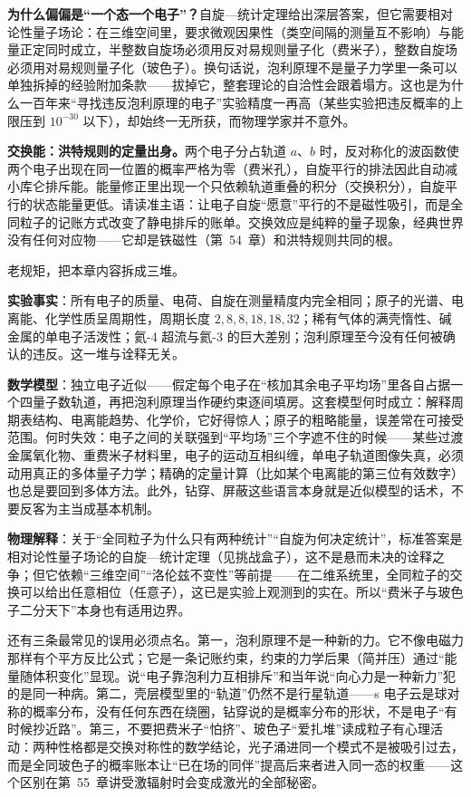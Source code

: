 \begin{challenge}
\textbf{为什么偏偏是“一个态一个电子”？}自旋—统计定理给出深层答案，但它需要相对论性量子场论：在三维空间里，要求微观因果性（类空间隔的测量互不影响）与能量正定同时成立，半整数自旋场必须用反对易规则量子化（费米子），整数自旋场必须用对易规则量子化（玻色子）。换句话说，泡利原理不是量子力学里一条可以单独拆掉的经验附加条款——拔掉它，整套理论的自洽性会跟着塌方。这也是为什么一百年来“寻找违反泡利原理的电子”实验精度一再高（某些实验把违反概率的上限压到 \(10^{-30}\) 以下），却始终一无所获，而物理学家并不意外。

\textbf{交换能：洪特规则的定量出身。}两个电子分占轨道 \(a\)、\(b\) 时，反对称化的波函数使两个电子出现在同一位置的概率严格为零（费米孔），自旋平行的排法因此自动减小库仑排斥能。能量修正里出现一个只依赖轨道重叠的积分（交换积分），自旋平行的状态能量更低。请读准主语：让电子自旋“愿意”平行的不是磁性吸引，而是全同粒子的记账方式改变了静电排斥的账单。交换效应是纯粹的量子现象，经典世界没有任何对应物——它却是铁磁性（第~54~章）和洪特规则共同的根。
\end{challenge}


老规矩，把本章内容拆成三堆。

\textbf{实验事实}：所有电子的质量、电荷、自旋在测量精度内完全相同；原子的光谱、电离能、化学性质呈周期性，周期长度 \(2,8,8,18,18,32\)；稀有气体的满壳惰性、碱金属的单电子活泼性；氦-4 超流与氦-3 的巨大差别；泡利原理至今没有任何被确认的违反。这一堆与诠释无关。

\textbf{数学模型}：独立电子近似——假定每个电子在“核加其余电子平均场”里各自占据一个四量子数轨道，再把泡利原理当作硬约束逐间填房。这套模型何时成立：解释周期表结构、电离能趋势、化学价，它好得惊人；原子的粗略能量，误差常在可接受范围。何时失效：电子之间的关联强到“平均场”三个字遮不住的时候——某些过渡金属氧化物、重费米子材料里，电子的运动互相纠缠，单电子轨道图像失真，必须动用真正的多体量子力学；精确的定量计算（比如某个电离能的第三位有效数字）也总是要回到多体方法。此外，钻穿、屏蔽这些语言本身就是近似模型的话术，不要反客为主当成基本机制。

\textbf{物理解释}：关于“全同粒子为什么只有两种统计”“自旋为何决定统计”，标准答案是相对论性量子场论的自旋—统计定理（见挑战盒子），这不是悬而未决的诠释之争；但它依赖“三维空间”“洛伦兹不变性”等前提——在二维系统里，全同粒子的交换可以给出任意相位（任意子），这已是实验上观测到的实在。所以“费米子与玻色子二分天下”本身也有适用边界。

还有三条最常见的误用必须点名。第一，泡利原理不是一种新的力。它不像电磁力那样有个平方反比公式；它是一条记账约束，约束的力学后果（简并压）通过“能量随体积变化”显现。说“电子靠泡利力互相排斥”和当年说“向心力是一种新力”犯的是同一种病。第二，壳层模型里的“轨道”仍然不是行星轨道——s 电子云是球对称的概率分布，没有任何东西在绕圈，钻穿说的是概率分布的形状，不是电子“有时候抄近路”。第三，不要把费米子“怕挤”、玻色子“爱扎堆”读成粒子有心理活动：两种性格都是交换对称性的数学结论，光子涌进同一个模式不是被吸引过去，而是全同玻色子的概率账本让“已在场的同伴”提高后来者进入同一态的权重——这个区别在第~55~章讲受激辐射时会变成激光的全部秘密。


